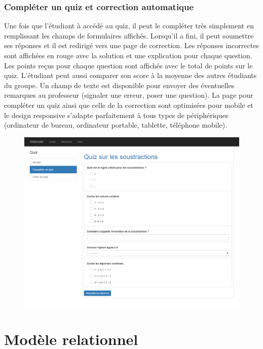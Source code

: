 \documentclass[letterpaper,10pt,french]{sphinxmanual}
\begin{document}
\subsection{Compléter un quiz et correction automatique}
\label{functionalities:completer-un-quiz-et-correction-automatique}
Une fois que l'étudiant à accédé au quiz, il peut le compléter très simplement en remplissant les champs de formulaires affichés. Lorsqu'il a fini, il peut soumettre ses réponses et il est redirigé vers une page de correction. Les réponses incorrectes sont affichées en rouge avec la solution et une explication pour chaque question. Les points reçus pour chaque question sont affichés avec le total de points sur le quiz. L'étudiant peut aussi comparer son score à la moyenne des autres étudiants du groupe. Un champ de texte est disponible pour envoyer des éventuelles remarques au professeur (signaler une erreur, poser une question). La page pour compléter un quiz ainsi que celle de la correction sont optimisées pour mobile et le design responsive s'adapte parfaitement à tous types de périphériques (ordinateur de bureau, ordinateur portable, tablette, téléphone mobile).
\begin{figure}[htbp]
\centering

\includegraphics{complete.png}
\end{figure}


\chapter{Modèle relationnel}
\label{database:modele-relationnel}\label{database::doc}
\end{document}
